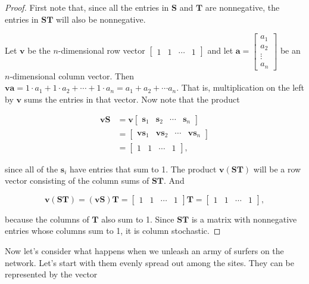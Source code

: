 \documentclass[
]{book}
\theoremstyle{definition}
\theoremstyle{definition}
\theoremstyle{definition}
\theoremstyle{definition}
\theoremstyle{remark}
\begin{document}
\begin{proof}
First note that, since all the entries in \(\mathbf{S}\) and \(\mathbf{T}\) are nonnegative, the entries in \(\mathbf{ST}\) will also be nonnegative.

Let \(\mathbf{v}\) be the \(n\)-dimensional row vector \(\begin{bmatrix} 1 & 1 & \cdots & 1\end{bmatrix}\) and let \(\mathbf{a}=\begin{bmatrix} a_1\\a_2\\ \vdots \\ a_n\end{bmatrix}\) be an \(n\)-dimensional column vector. Then \(\mathbf{v}\mathbf{a}=1\cdot a_1+1\cdot a_2+\cdots+1\cdot a_n=a_1+a_2+\cdots a_n\). That is, multiplication on the left by \(\mathbf{v}\) sums the entries in that vector. Now note that the product

\begin{align*}
\mathbf{v}\mathbf{S}&=\mathbf{v}\begin{bmatrix}\mathbf{s}_1 & \mathbf{s}_2 & \cdots & \mathbf{s}_n\end{bmatrix}\\
&=\begin{bmatrix}\mathbf{v}\mathbf{s}_1 & \mathbf{v}\mathbf{s}_2 & \cdots & \mathbf{v}\mathbf{s}_n\end{bmatrix}\\
&=\begin{bmatrix} 1 & 1 & \cdots & 1\end{bmatrix},
\end{align*}

since all of the \(\mathbf{s}_i\) have entries that sum to 1. The product \(\mathbf{v}(\mathbf{ST})\) will be a row vector consisting of the column sums of \(\mathbf{ST}\). And

\[\mathbf{v}(\mathbf{ST})=(\mathbf{v}\mathbf{S})\mathbf{T}=\begin{bmatrix} 1 & 1 & \cdots & 1\end{bmatrix}\mathbf{T}=\begin{bmatrix} 1 & 1 & \cdots & 1\end{bmatrix},\]

because the columns of \(\mathbf{T}\) also sum to 1. Since \(\mathbf{ST}\) is a matrix with nonnegative entries whose columns sum to 1, it is column stochastic.
\end{proof}

Now let's consider what happens when we unleash an army of surfers on the network. Let's start with them evenly spread out among the sites. They can be represented by the vector
\end{document}
